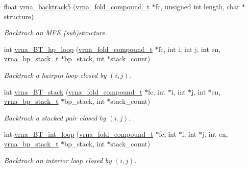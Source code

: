 \begin{DoxyCompactItemize}
\item 
float \mbox{\hyperlink{group__mfe__backtracking_gaaee7355f060fe9eed8e687522567715e}{vrna\+\_\+backtrack5}} (\mbox{\hyperlink{group__fold__compound_ga1b0cef17fd40466cef5968eaeeff6166}{vrna\+\_\+fold\+\_\+compound\+\_\+t}} $\ast$fc, unsigned int length, char $\ast$structure)
\begin{DoxyCompactList}\small\item\em Backtrack an M\+FE (sub)structure. \end{DoxyCompactList}\item 
int \mbox{\hyperlink{group__mfe__backtracking_gae20d5805ddedc9b81d24735b11b6a9bf}{vrna\+\_\+\+B\+T\+\_\+hp\+\_\+loop}} (\mbox{\hyperlink{group__fold__compound_ga1b0cef17fd40466cef5968eaeeff6166}{vrna\+\_\+fold\+\_\+compound\+\_\+t}} $\ast$fc, int i, int j, int en, \mbox{\hyperlink{group__data__structures_gaa651bda42e7692f08cb603cd6834b0ee}{vrna\+\_\+bp\+\_\+stack\+\_\+t}} $\ast$bp\+\_\+stack, int $\ast$stack\+\_\+count)
\begin{DoxyCompactList}\small\item\em Backtrack a hairpin loop closed by $ (i,j) $. \end{DoxyCompactList}\item 
int \mbox{\hyperlink{group__mfe__backtracking_ga28015cfbd0afc759b94ff58cc241cb13}{vrna\+\_\+\+B\+T\+\_\+stack}} (\mbox{\hyperlink{group__fold__compound_ga1b0cef17fd40466cef5968eaeeff6166}{vrna\+\_\+fold\+\_\+compound\+\_\+t}} $\ast$fc, int $\ast$i, int $\ast$j, int $\ast$en, \mbox{\hyperlink{group__data__structures_gaa651bda42e7692f08cb603cd6834b0ee}{vrna\+\_\+bp\+\_\+stack\+\_\+t}} $\ast$bp\+\_\+stack, int $\ast$stack\+\_\+count)
\begin{DoxyCompactList}\small\item\em Backtrack a stacked pair closed by $ (i,j) $. \end{DoxyCompactList}\item 
int \mbox{\hyperlink{group__mfe__backtracking_ga90b5a5723173996fb40640ce7c95c07e}{vrna\+\_\+\+B\+T\+\_\+int\+\_\+loop}} (\mbox{\hyperlink{group__fold__compound_ga1b0cef17fd40466cef5968eaeeff6166}{vrna\+\_\+fold\+\_\+compound\+\_\+t}} $\ast$fc, int $\ast$i, int $\ast$j, int en, \mbox{\hyperlink{group__data__structures_gaa651bda42e7692f08cb603cd6834b0ee}{vrna\+\_\+bp\+\_\+stack\+\_\+t}} $\ast$bp\+\_\+stack, int $\ast$stack\+\_\+count)
\begin{DoxyCompactList}\small\item\em Backtrack an interior loop closed by $ (i,j) $. \end{DoxyCompactList}\item 

\end{DoxyCompactItemize}
